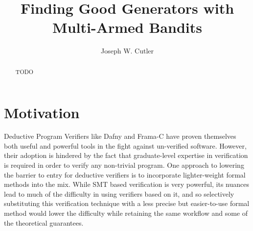 \documentclass[sigconf,nonacm]{acmart}
\begin{document}
\title{Finding Good Generators with Multi-Armed Bandits}

\author{Joseph W. Cutler}

\renewcommand{\shortauthors}{Cutler}

\begin{abstract}
    TODO
\end{abstract}

\maketitle


\section{Motivation}
Deductive Program Verifiers like Dafny and Frama-C have proven themselves both useful and powerful tools in the fight against un-verified software.
However, their adoption is hindered by the fact that graduate-level expertise in verification is required in order to verify any non-trivial program. One approach to lowering the barrier to entry for deductive verifiers is to incorporate lighter-weight formal methods into the mix. While SMT based verification is very powerful, its nuances lead to much of the difficulty in using verifiers based on it, and so selectively substituting this verification technique with a less precise but easier-to-use formal method would lower the difficulty while retaining the same workflow and some of the theoretical guarantees.
\end{document}

